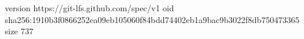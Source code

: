 version https://git-lfs.github.com/spec/v1
oid sha256:1910b3f0866252ea09eb105060f84bdd74402eb1a9bac9b3022f8db750473365
size 737
